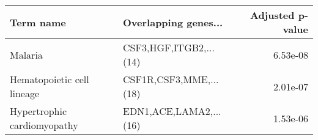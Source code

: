 \begin{tabular}{llr}
\toprule
                  Term name &   Overlapping genes... &  Adjusted p-value \\
\midrule
                    Malaria & CSF3,HGF,ITGB2,...(14) &          6.53e-08 \\
 Hematopoietic cell lineage & CSF1R,CSF3,MME,...(18) &          2.01e-07 \\
Hypertrophic cardiomyopathy & EDN1,ACE,LAMA2,...(16) &          1.53e-06 \\
\bottomrule
\end{tabular}
